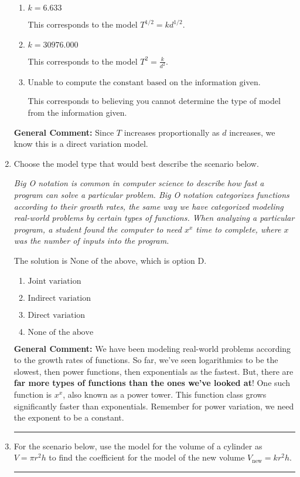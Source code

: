 \documentclass{extbook}[14pt]
\newcommand{\litem}[1]{\item #1

\rule{\textwidth}{0.4pt}}
\begin{document}
\begin{enumerate}
{\begin{enumerate}[label=\Alph*.]
This copies the constant used in the homework.
\item \( k = 6.633 \)

This corresponds to the model $T^{1/2} = k d^{1/2}$.
\item \( k = 30976.000 \)

This corresponds to the model $T^{2} = \frac{k}{d^{2}}$.
\item \( \text{Unable to compute the constant based on the information given.} \)

This corresponds to believing you cannot determine the type of model from the information given.
\end{enumerate}

\textbf{General Comment:} Since $T$ increases proportionally as $d$ increases, we know this is a direct variation model.
}
\litem{
Choose the model type that would best describe the scenario below.

\begin{center}
    \textit{ Big O notation is common in computer science to describe how fast a program can solve a particular problem. Big O notation categorizes functions according to their growth rates, the same way we have categorized modeling real-world problems by certain types of functions. When analyzing a particular program, a student found the computer to need $x^x$ time to complete, where $x$ was the number of inputs into the program. }
\end{center}
The solution is \( \text{None of the above} \), which is option D.\begin{enumerate}[label=\Alph*.]
\item \( \text{Joint variation} \)


\item \( \text{Indirect variation} \)


\item \( \text{Direct variation} \)


\item \( \text{None of the above} \)


\end{enumerate}

\textbf{General Comment:} We have been modeling real-world problems according to the growth rates of functions. So far, we've seen logarithmics to be the slowest, then power functions, then exponentials as the fastest. But, there are \textbf{far more types of functions than the ones we've looked at}! One such function is $x^x$, also known as a power tower. This function class grows significantly faster than exponentials. Remember for power variation, we need the exponent to be a constant.
}
\litem{
For the scenario below, use the model for the volume of a cylinder as $V = \pi r^2 h$ to find the coefficient for the model of the new volume $V_{\text{new}} = k r^2 h$.

}
\end{enumerate}
\end{document}
